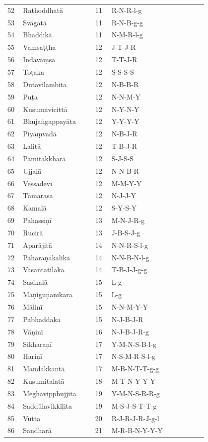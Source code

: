 {\begin{longtable}[c]{p{0.04\linewidth}p{0.30\linewidth}p{0.06\linewidth}p{0.40\linewidth}}
52 & Rathoddhatā & 11 & R-N-R-l-g \\
53 & Svāgatā & 11 & R-N-B-g-g \\
54 & Bhaddikā & 11 & N-M-R-l-g \\
55 & Vaṃsaṭṭha & 12 & J-T-J-R \\
56 & Indavaṃsā & 12 & T-T-J-R \\
57 & Toṭaka & 12 & S-S-S-S \\
58 & Dutavilambita & 12 & N-B-B-R \\
59 & Puṭa & 12 & N-N-M-Y \\
60 & Kusumavicittā & 12 & N-Y-N-Y \\
61 & Bhujaṅgappayāta & 12 & Y-Y-Y-Y \\
62 & Piyaṃvadā & 12 & N-B-J-R \\
63 & Lalitā & 12 & T-B-J-R \\
64 & Pamitakkharā & 12 & S-J-S-S \\
65 & Ujjalā & 12 & N-N-B-R \\
66 & Vessadevī & 12 & M-M-Y-Y \\
67 & Tāmarasa & 12 & N-J-J-Y \\
68 & Kamalā & 12 & S-Y-S-Y \\
69 & Pahassiṇī & 13 & M-N-J-R-g \\
70 & Rucirā & 13 & J-B-S-J-g \\
71 & Aparājitā & 14 & N-N-R-S-l-g \\
72 & Paharaṇakalikā & 14 & N-N-B-N-l-g \\
73 & Vasantatilakā & 14 & T-B-J-J-g-g \\
74 & Sasikalā & 15 & L-g \\
75 & Maṇiguṇanikara & 15 & L-g \\
76 & Mālinī & 15 & N-N-M-Y-Y \\
77 & Pabhaddaka & 15 & N-J-B-J-R \\
78 & Vāṇinī & 16 & N-J-B-J-R-g \\
79 & Sikharaṇī & 17 & Y-M-N-S-B-l-g \\
80 & Hariṇī & 17 & N-S-M-R-S-l-g \\
81 & Mandakkantā & 17 & M-B-N-T-T-g-g \\
82 & Kusumitalatā & 18 & M-T-N-Y-Y-Y \\
83 & Meghavipphujjitā & 19 & Y-M-N-S-R-R-g \\
84 & Saddūlavikkīḷita & 19 & M-S-J-S-T-T-g \\
85 & Vutta & 20 & R-J-R-J-R-J-g-l \\
86 & Sandharā & 21 & M-R-B-N-Y-Y-Y \\

\end{longtable}}
